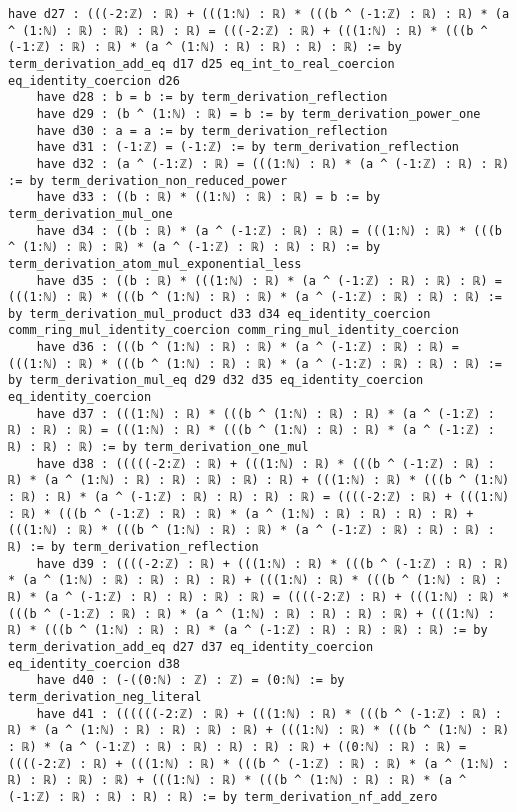 \documentclass{article}
\begin{document}
\begin{tcolorbox}[colback=white!10, width=\linewidth]
\begin{lstlisting}[language=Lean4]
    have d27 : (((-2:ℤ) : ℝ) + (((1:ℕ) : ℝ) * (((b ^ (-1:ℤ) : ℝ) : ℝ) * (a ^ (1:ℕ) : ℝ) : ℝ) : ℝ) : ℝ) = (((-2:ℤ) : ℝ) + (((1:ℕ) : ℝ) * (((b ^ (-1:ℤ) : ℝ) : ℝ) * (a ^ (1:ℕ) : ℝ) : ℝ) : ℝ) : ℝ) := by term_derivation_add_eq d17 d25 eq_int_to_real_coercion eq_identity_coercion d26
    have d28 : b = b := by term_derivation_reflection
    have d29 : (b ^ (1:ℕ) : ℝ) = b := by term_derivation_power_one
    have d30 : a = a := by term_derivation_reflection
    have d31 : (-1:ℤ) = (-1:ℤ) := by term_derivation_reflection
    have d32 : (a ^ (-1:ℤ) : ℝ) = (((1:ℕ) : ℝ) * (a ^ (-1:ℤ) : ℝ) : ℝ) := by term_derivation_non_reduced_power
    have d33 : ((b : ℝ) * ((1:ℕ) : ℝ) : ℝ) = b := by term_derivation_mul_one
    have d34 : ((b : ℝ) * (a ^ (-1:ℤ) : ℝ) : ℝ) = (((1:ℕ) : ℝ) * (((b ^ (1:ℕ) : ℝ) : ℝ) * (a ^ (-1:ℤ) : ℝ) : ℝ) : ℝ) := by term_derivation_atom_mul_exponential_less
    have d35 : ((b : ℝ) * (((1:ℕ) : ℝ) * (a ^ (-1:ℤ) : ℝ) : ℝ) : ℝ) = (((1:ℕ) : ℝ) * (((b ^ (1:ℕ) : ℝ) : ℝ) * (a ^ (-1:ℤ) : ℝ) : ℝ) : ℝ) := by term_derivation_mul_product d33 d34 eq_identity_coercion comm_ring_mul_identity_coercion comm_ring_mul_identity_coercion
    have d36 : (((b ^ (1:ℕ) : ℝ) : ℝ) * (a ^ (-1:ℤ) : ℝ) : ℝ) = (((1:ℕ) : ℝ) * (((b ^ (1:ℕ) : ℝ) : ℝ) * (a ^ (-1:ℤ) : ℝ) : ℝ) : ℝ) := by term_derivation_mul_eq d29 d32 d35 eq_identity_coercion eq_identity_coercion
    have d37 : (((1:ℕ) : ℝ) * (((b ^ (1:ℕ) : ℝ) : ℝ) * (a ^ (-1:ℤ) : ℝ) : ℝ) : ℝ) = (((1:ℕ) : ℝ) * (((b ^ (1:ℕ) : ℝ) : ℝ) * (a ^ (-1:ℤ) : ℝ) : ℝ) : ℝ) := by term_derivation_one_mul
    have d38 : (((((-2:ℤ) : ℝ) + (((1:ℕ) : ℝ) * (((b ^ (-1:ℤ) : ℝ) : ℝ) * (a ^ (1:ℕ) : ℝ) : ℝ) : ℝ) : ℝ) : ℝ) + (((1:ℕ) : ℝ) * (((b ^ (1:ℕ) : ℝ) : ℝ) * (a ^ (-1:ℤ) : ℝ) : ℝ) : ℝ) : ℝ) = ((((-2:ℤ) : ℝ) + (((1:ℕ) : ℝ) * (((b ^ (-1:ℤ) : ℝ) : ℝ) * (a ^ (1:ℕ) : ℝ) : ℝ) : ℝ) : ℝ) + (((1:ℕ) : ℝ) * (((b ^ (1:ℕ) : ℝ) : ℝ) * (a ^ (-1:ℤ) : ℝ) : ℝ) : ℝ) : ℝ) := by term_derivation_reflection
    have d39 : ((((-2:ℤ) : ℝ) + (((1:ℕ) : ℝ) * (((b ^ (-1:ℤ) : ℝ) : ℝ) * (a ^ (1:ℕ) : ℝ) : ℝ) : ℝ) : ℝ) + (((1:ℕ) : ℝ) * (((b ^ (1:ℕ) : ℝ) : ℝ) * (a ^ (-1:ℤ) : ℝ) : ℝ) : ℝ) : ℝ) = ((((-2:ℤ) : ℝ) + (((1:ℕ) : ℝ) * (((b ^ (-1:ℤ) : ℝ) : ℝ) * (a ^ (1:ℕ) : ℝ) : ℝ) : ℝ) : ℝ) + (((1:ℕ) : ℝ) * (((b ^ (1:ℕ) : ℝ) : ℝ) * (a ^ (-1:ℤ) : ℝ) : ℝ) : ℝ) : ℝ) := by term_derivation_add_eq d27 d37 eq_identity_coercion eq_identity_coercion d38
    have d40 : (-((0:ℕ) : ℤ) : ℤ) = (0:ℕ) := by term_derivation_neg_literal
    have d41 : ((((((-2:ℤ) : ℝ) + (((1:ℕ) : ℝ) * (((b ^ (-1:ℤ) : ℝ) : ℝ) * (a ^ (1:ℕ) : ℝ) : ℝ) : ℝ) : ℝ) + (((1:ℕ) : ℝ) * (((b ^ (1:ℕ) : ℝ) : ℝ) * (a ^ (-1:ℤ) : ℝ) : ℝ) : ℝ) : ℝ) : ℝ) + ((0:ℕ) : ℝ) : ℝ) = ((((-2:ℤ) : ℝ) + (((1:ℕ) : ℝ) * (((b ^ (-1:ℤ) : ℝ) : ℝ) * (a ^ (1:ℕ) : ℝ) : ℝ) : ℝ) : ℝ) + (((1:ℕ) : ℝ) * (((b ^ (1:ℕ) : ℝ) : ℝ) * (a ^ (-1:ℤ) : ℝ) : ℝ) : ℝ) : ℝ) := by term_derivation_nf_add_zero

\end{lstlisting}
\end{tcolorbox}
\end{document}
